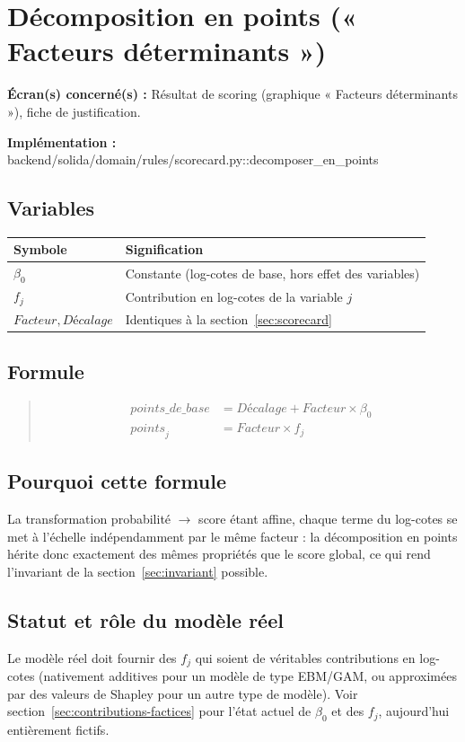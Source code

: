 \documentclass[11pt,a4paper]{article}
\newcommand{\brk}{\allowbreak}
\newcommand{\ecran}[1]{\noindent\textbf{Écran(s) concerné(s) :} #1\par}
\newcommand{\fichier}[1]{\noindent\textbf{Implémentation :} \tiny\ttfamily#1\normalfont\normalsize\par}
\newenvironment{formule}{\begin{quote}}{\end{quote}}
\begin{document}
\section{Décomposition en points (« Facteurs déterminants »)}
\label{sec:decomposition}

\ecran{Résultat de scoring (graphique « Facteurs déterminants »), fiche de justification.}
\fichier{backend/\brk solida/\brk domain/\brk rules/\brk scorecard.py::\brk{}decomposer\_en\_points}

\subsection*{Variables}

\begin{tabular}{@{}lL{10cm}@{}}
\toprule
Symbole & Signification \\
\midrule
$\beta_0$ & Constante (log-cotes de base, hors effet des variables) \\
$f_j$ & Contribution en log-cotes de la variable $j$ \\
$\mathit{Facteur}, \mathit{Décalage}$ & Identiques à la section~\ref{sec:scorecard} \\
\bottomrule
\end{tabular}

\subsection*{Formule}
\begin{formule}
\begin{align}
\mathit{points\_de\_base} &= \mathit{Décalage} + \mathit{Facteur} \times \beta_0 \\
\mathit{points}_j &= \mathit{Facteur} \times f_j
\end{align}
\end{formule}

\subsection*{Pourquoi cette formule}
La transformation probabilité $\to$ score étant affine, chaque terme du log-cotes se met à
l'échelle indépendamment par le même facteur : la décomposition en points hérite donc exactement
des mêmes propriétés que le score global, ce qui rend l'invariant de la section~\ref{sec:invariant}
possible.

\subsection*{Statut et rôle du modèle réel}
Le modèle réel doit fournir des $f_j$ qui soient de véritables contributions en log-cotes
(nativement additives pour un modèle de type EBM/GAM, ou approximées par des valeurs de Shapley
pour un autre type de modèle). Voir section~\ref{sec:contributions-factices} pour l'état actuel de
$\beta_0$ et des $f_j$, aujourd'hui entièrement fictifs.
\end{document}
